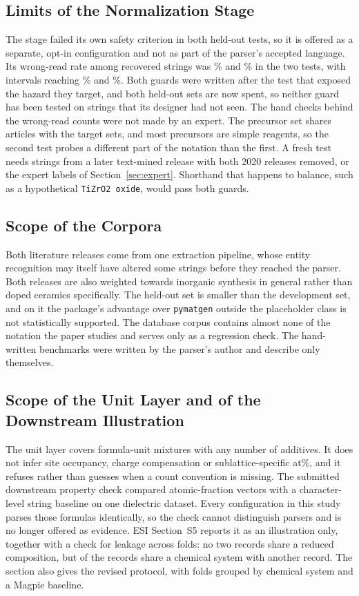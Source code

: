 \documentclass[10pt,journal]{IEEEtran}
\newcommand{\pmg}{\texttt{pymatgen}\xspace}
\begin{document}
\subsection{Limits of the Normalization Stage}
The stage failed its own safety criterion in both held-out tests, so it is offered as a separate, opt-in configuration and not as part of the parser's accepted language. Its wrong-read rate among recovered strings was \StOneWrongPct\% and \StTwoWrongPct\% in the two tests, with intervals reaching \StOneWrongHi\% and \StTwoWrongHi\%. Both guards were written after the test that exposed the hazard they target, and both held-out sets are now spent, so neither guard has been tested on strings that its designer had not seen. The hand checks behind the wrong-read counts were not made by an expert. The precursor set shares articles with the target sets, and most precursors are simple reagents, so the second test probes a different part of the notation than the first. A fresh test needs strings from a later text-mined release with both 2020 releases removed, or the expert labels of Section~\ref{sec:expert}. Shorthand that happens to balance, such as a hypothetical \texttt{TiZrO2 oxide}, would pass both guards.

\subsection{Scope of the Corpora}
Both literature releases come from one extraction pipeline, whose entity recognition may itself have altered some strings before they reached the parser. Both releases are also weighted towards inorganic synthesis in general rather than doped ceramics specifically. The held-out set is smaller than the development set, and on it the package's advantage over \pmg outside the placeholder class is not statistically supported. The database corpus contains almost none of the notation the paper studies and serves only as a regression check. The hand-written benchmarks were written by the parser's author and describe only themselves.

\subsection{Scope of the Unit Layer and of the Downstream Illustration}
The unit layer covers formula-unit mixtures with any number of additives. It does not infer site occupancy, charge compensation or sublattice-specific at\%, and it refuses rather than guesses when a count convention is missing. The submitted downstream property check compared atomic-fraction vectors with a character-level string baseline on one dielectric dataset. Every configuration in this study parses those \NDiel{} formulas identically, so the check cannot distinguish parsers and is no longer offered as evidence. ESI Section~S5 reports it as an illustration only, together with a check for leakage across folds: no two records share a reduced composition, but \NDielInSharedSystems{} of the \NDiel{} records share a chemical system with another record. The section also gives the revised protocol, with folds grouped by chemical system and a Magpie baseline.
\end{document}
